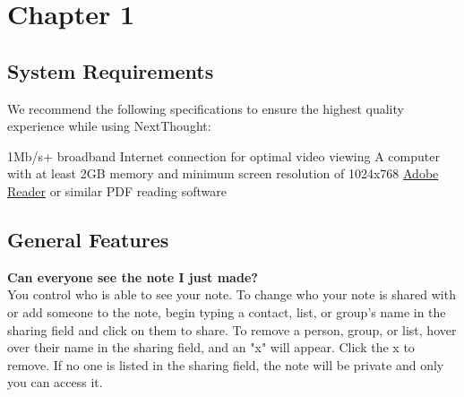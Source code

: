 \chapter{Chapter 1}
\label{chapter:1}

\section{System Requirements}
\label{section:System Requirements}

We recommend the following specifications to ensure the highest quality experience while using NextThought:

1Mb/s+ broadband Internet connection for optimal video viewing
A computer with at least 2GB memory and minimum screen resolution of 1024x768
\href{http://get.adobe.com/reader/}{Adobe Reader} or similar PDF reading software

\section{General Features}
\label{section:General_Features}

\textbf{Can everyone see the note I just made?}\\

You control who is able to see your note. To change who your note is shared with or add someone to the note, begin typing a contact, list, or group's name in the sharing field and click on them to share. To remove a person, group, or list, hover over their name in the sharing field, and an "x" will appear. Click the x to remove. If no one is listed in the sharing field, the note will be private and only you can access it.

